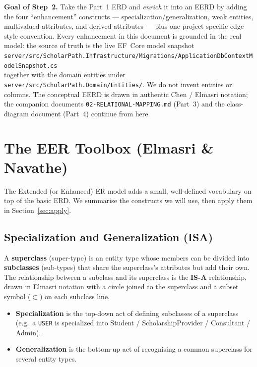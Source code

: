 \documentclass[11pt,a4paper]{article}
\begin{document}
\textbf{Goal of Step~2.} Take the Part~1 ERD and \emph{enrich} it into an EERD by
adding the four ``enhancement'' constructs --- specialization/generalization,
weak entities, multivalued attributes, and derived attributes --- plus one
project-specific edge-style convention. Every enhancement in this document is
grounded in the real model: the source of truth is the live EF~Core model
snapshot\\
\texttt{server/src/ScholarPath.Infrastructure/Migrations/ApplicationDbContextModelSnapshot.cs}\\
together with the domain entities under
\texttt{server/src/ScholarPath.Domain/Entities/}. We do not invent entities or
columns. The conceptual EERD is drawn in authentic Chen / Elmasri notation; the
companion documents \texttt{02-RELATIONAL-MAPPING.md} (Part~3) and the
class-diagram document (Part~4) continue from here.

\section{The EER Toolbox (Elmasri \& Navathe)}

The Extended (or Enhanced) ER model adds a small, well-defined vocabulary on top
of the basic ERD. We summarise the constructs we will use, then apply them in
Section~\ref{sec:apply}.

\subsection{Specialization and Generalization (ISA)}

A \textbf{superclass} (super-type) is an entity type whose members can be divided
into \textbf{subclasses} (sub-types) that share the superclass's attributes but
add their own. The relationship between a subclass and its superclass is the
\textbf{IS-A} relationship, drawn in Elmasri notation with a circle joined to the
superclass and a subset symbol ($\subset$) on each subclass line.

\begin{itemize}[leftmargin=1.4em]
  \item \textbf{Specialization} is the top-down act of defining subclasses of a
        superclass (e.g.\ a \texttt{USER} is specialized into Student /
        ScholarshipProvider / Consultant / Admin).
  \item \textbf{Generalization} is the bottom-up act of recognising a common
        superclass for several entity types.
\end{itemize}
\end{document}
